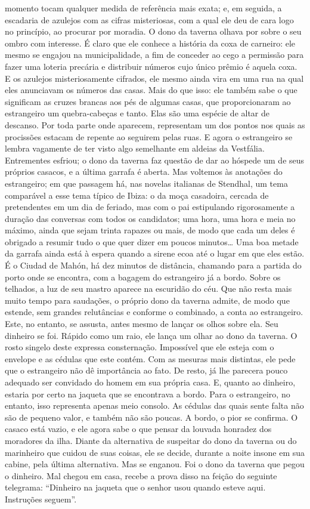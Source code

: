 momento tocam qualquer medida de referência mais exata; e, em seguida, a
escadaria de azulejos com as cifras misteriosas, com a qual ele deu de
cara logo no princípio, ao procurar por moradia. O dono da taverna
olhava por sobre o seu ombro com interesse. É claro que ele conhece a
história da coxa de carneiro: ele mesmo se engajou na municipalidade, a
fim de conceder ao cego a permissão para fazer uma loteria precária e
distribuir números cujo único prêmio é aquela coxa. E os azulejos
misteriosamente cifrados, ele mesmo ainda vira em uma rua na qual eles
anunciavam os números das casas. Mais do que isso: ele também sabe o que
significam as cruzes brancas aos pés de algumas casas, que
proporcionaram ao estrangeiro um quebra-cabeças e tanto. Elas são uma
espécie de altar de descanso. Por toda parte onde aparecem, representam
um dos pontos nos quais as procissões estacam de repente ao seguirem
pelas ruas. E agora o estrangeiro se lembra vagamente de ter visto algo
semelhante em aldeias da Vestfália. Entrementes esfriou; o dono da
taverna faz questão de dar ao hóspede um de seus próprios casacos, e a
última garrafa é aberta. Mas voltemos às anotações do estrangeiro; em
que passagem há, nas novelas italianas de Stendhal, um tema comparável a
esse tema típico de Ibiza: o da moça casadoira, cercada de pretendentes
em um dia de feriado, mas com o pai estipulando rigorosamente a duração
das conversas com todos os candidatos; uma hora, uma hora e meia no
máximo, ainda que sejam trinta rapazes ou mais, de modo que cada um
deles é obrigado a resumir tudo o que quer dizer em poucos minutos\ldots{}
Uma boa metade da garrafa ainda está à espera quando a sirene ecoa até o
lugar em que eles estão. É o Ciudad de Mahón, há dez minutos de
distância, chamando para a partida do porto onde se encontra, com a
bagagem do estrangeiro já a bordo. Sobre os telhados, a luz de seu
mastro aparece na escuridão do céu. Que não resta mais muito tempo para
saudações, o próprio dono da taverna admite, de modo que estende, sem
grandes relutâncias e conforme o combinado, a conta ao estrangeiro.
Este, no entanto, se assusta, antes mesmo de lançar os olhos sobre ela.
Seu dinheiro se foi. Rápido como um raio, ele lança um olhar ao dono da
taverna. O rosto singelo deste expressa consternação. Impossível que ele
esteja com o envelope e as cédulas que este contém. Com as mesuras mais
distintas, ele pede que o estrangeiro não dê importância ao fato. De
resto, já lhe parecera pouco adequado ser convidado do homem em sua
própria casa. E, quanto ao dinheiro, estaria por certo na jaqueta que se
encontrava a bordo. Para o estrangeiro, no entanto, isso representa
apenas meio consolo. As cédulas das quais sente falta não são de pequeno
valor, e também não são poucas. A bordo, o pior se confirma. O casaco
está vazio, e ele agora sabe o que pensar da louvada honradez dos
moradores da ilha. Diante da alternativa de suspeitar do dono da taverna
ou do marinheiro que cuidou de suas coisas, ele se decide, durante a
noite insone em sua cabine, pela última alternativa. Mas se enganou. Foi
o dono da taverna que pegou o dinheiro. Mal chegou em casa, recebe a
prova disso na feição do seguinte telegrama: ``Dinheiro na jaqueta que o
senhor usou quando esteve aqui. Instruções seguem''.

